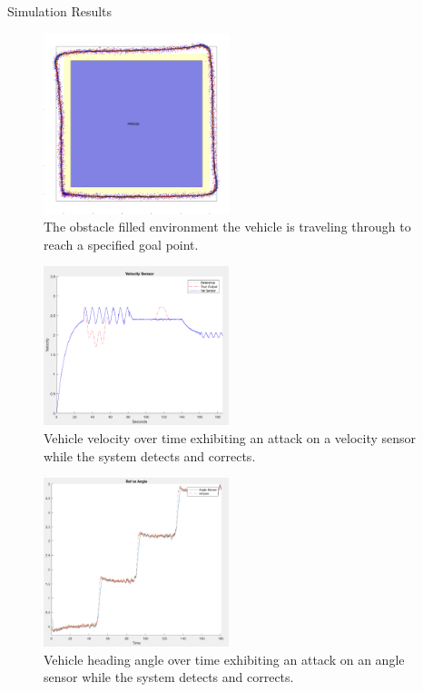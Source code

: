 \begin{section}{Simulation Results}
\begin{figure}
\vspace{1pt}
\centering
\includegraphics[width=0.48\textwidth]{sim_environment.png}
\caption{The obstacle filled environment the vehicle is traveling through to reach a specified goal point.}
\label{fig:sim_env}
\end{figure}

\begin{figure}
\vspace{1pt}
\centering
\includegraphics[width=0.48\textwidth]{vel_t.png}
\caption{Vehicle velocity over time exhibiting an attack on a velocity sensor while the system detects and corrects.}
\label{fig:vel_t}
\end{figure}

\begin{figure}
\vspace{1pt}
\centering
\includegraphics[width=0.48\textwidth]{ang_t.png}
\caption{Vehicle heading angle over time exhibiting an attack on an angle sensor while the system detects and corrects.}
\label{fig:ang_t}
\end{figure}

\end{section}
